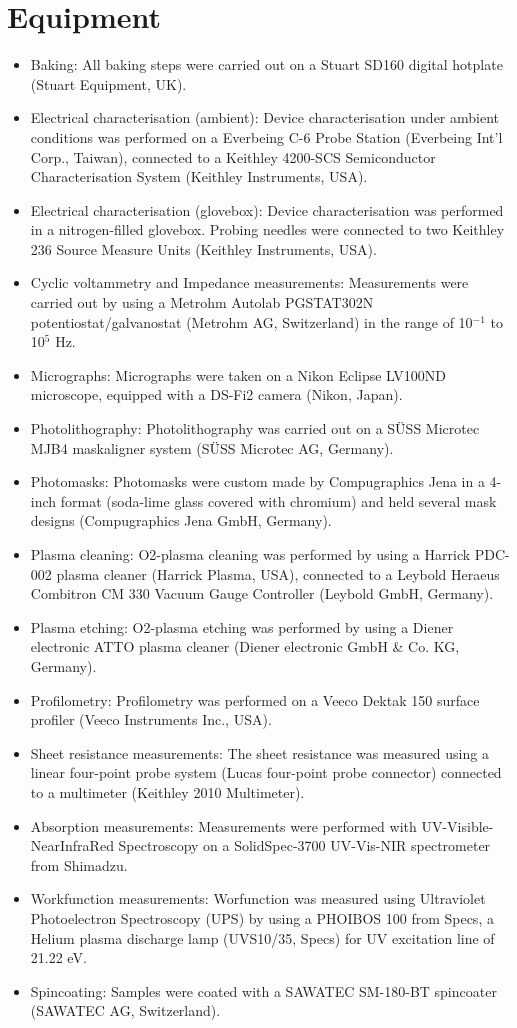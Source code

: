 \section{Equipment}
\begin{itemize}
\item Baking: All baking steps were carried out on a Stuart SD160 digital hotplate (Stuart Equipment, UK). 
\item Electrical characterisation (ambient): Device characterisation under ambient conditions was performed on a Everbeing C-6 Probe Station (Everbeing Int’l Corp., Taiwan), connected to a Keithley 4200-SCS Semiconductor Characterisation System (Keithley Instruments, USA). 
\item Electrical characterisation (glovebox): Device characterisation was performed in a nitrogen-filled glovebox. Probing needles were connected to two Keithley 236 Source Measure Units (Keithley Instruments, USA). 
\item Cyclic voltammetry and Impedance measurements: Measurements were carried out by using a Metrohm Autolab PGSTAT302N potentiostat/galvanostat (Metrohm AG, Switzerland) in the range of 10$^{-1}$ to 10$^{5}$ Hz. 
\item Micrographs: Micrographs were taken on a Nikon Eclipse LV100ND microscope, equipped with a DS-Fi2 camera (Nikon, Japan). 
\item Photolithography: Photolithography was carried out on a SÜSS Microtec MJB4 maskaligner system (SÜSS Microtec AG, Germany). 
\item Photomasks: Photomasks were custom made by Compugraphics Jena in a 4-inch format (soda-lime glass covered with chromium) and held several mask designs (Compugraphics Jena GmbH, Germany). 
\item Plasma cleaning: O2-plasma cleaning was performed by using a Harrick PDC-002 plasma cleaner (Harrick Plasma, USA), connected to a Leybold Heraeus Combitron CM 330 Vacuum Gauge Controller (Leybold GmbH, Germany). 
\item Plasma etching: O2-plasma etching was performed by using a Diener electronic ATTO plasma cleaner (Diener electronic GmbH \& Co. KG, Germany). 
\item Profilometry: Profilometry was performed on a Veeco Dektak 150 surface profiler (Veeco Instruments Inc., USA).
\item Sheet resistance measurements: The sheet resistance was measured using a linear four-point probe system (Lucas four-point probe connector) connected to a multimeter (Keithley 2010 Multimeter).
\item Absorption measurements: Measurements were performed with UV-Visible-NearInfraRed Spectroscopy on a SolidSpec-3700 UV-Vis-NIR spectrometer from Shimadzu.
\item Workfunction measurements: Worfunction was measured using Ultraviolet Photoelectron Spectroscopy (UPS) by using a PHOIBOS 100 from Specs, a Helium plasma discharge lamp (UVS10/35, Specs) for UV excitation line of 21.22 eV.
\item Spincoating: Samples were coated with a SAWATEC SM-180-BT spincoater (SAWATEC AG, Switzerland).
\end{itemize}

